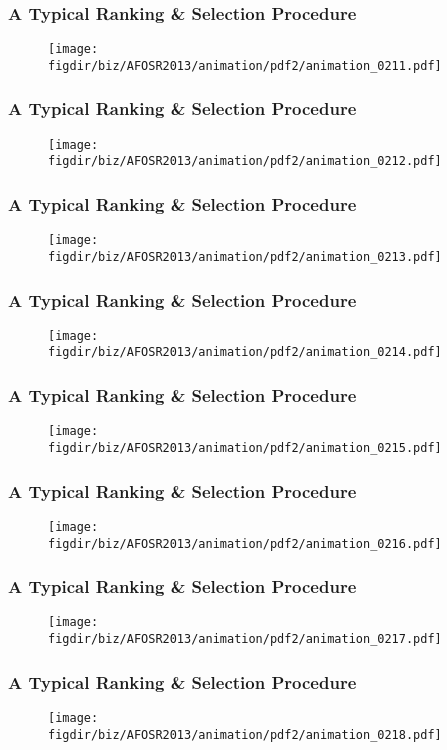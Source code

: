 \documentclass[13pt]{beamer}
\newcommand{\figdir}{../../fig}
\begin{document}
{\begin{frame}\frametitle{A Typical Ranking \& Selection Procedure}\begin{figure}\texttt{[image: \\figdir/biz/AFOSR2013/animation/pdf2/animation\_0211.pdf]}\end{figure}\end{frame}
\begin{frame}\frametitle{A Typical Ranking \& Selection Procedure}\begin{figure}\texttt{[image: \\figdir/biz/AFOSR2013/animation/pdf2/animation\_0212.pdf]}\end{figure}\end{frame}
\begin{frame}\frametitle{A Typical Ranking \& Selection Procedure}\begin{figure}\texttt{[image: \\figdir/biz/AFOSR2013/animation/pdf2/animation\_0213.pdf]}\end{figure}\end{frame}
\begin{frame}\frametitle{A Typical Ranking \& Selection Procedure}\begin{figure}\texttt{[image: \\figdir/biz/AFOSR2013/animation/pdf2/animation\_0214.pdf]}\end{figure}\end{frame}
\begin{frame}\frametitle{A Typical Ranking \& Selection Procedure}\begin{figure}\texttt{[image: \\figdir/biz/AFOSR2013/animation/pdf2/animation\_0215.pdf]}\end{figure}\end{frame}
\begin{frame}\frametitle{A Typical Ranking \& Selection Procedure}\begin{figure}\texttt{[image: \\figdir/biz/AFOSR2013/animation/pdf2/animation\_0216.pdf]}\end{figure}\end{frame}
\begin{frame}\frametitle{A Typical Ranking \& Selection Procedure}\begin{figure}\texttt{[image: \\figdir/biz/AFOSR2013/animation/pdf2/animation\_0217.pdf]}\end{figure}\end{frame}
\begin{frame}\frametitle{A Typical Ranking \& Selection Procedure}\begin{figure}\texttt{[image: \\figdir/biz/AFOSR2013/animation/pdf2/animation\_0218.pdf]}\end{figure}\end{frame}
}
\end{document}
